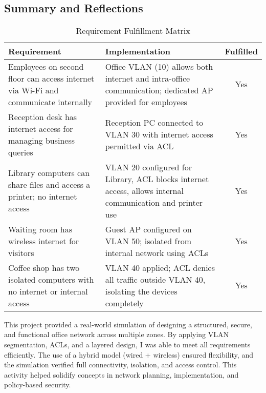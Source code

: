 \documentclass[11pt,a4paper]{article}
\let\oldincludegraphics\includegraphics
\renewcommand{\includegraphics}[2][]{%
  \begin{center}
    \oldincludegraphics[#1]{#2}
  \end{center}
}
\begin{document}
\begin{center}
\\[1em]
\\[1em]
\\[1em]
\\[1em]
\\[1em]
\\[1em]
\end{center}


\subsection{Summary and Reflections}

\begin{table}[h!]
\centering
\begin{tabular}{|p{6cm}|p{6cm}|c|}
\hline
\textbf{Requirement} & \textbf{Implementation} & \textbf{Fulfilled} \\
\hline
Employees on second floor can access internet via Wi-Fi and communicate internally & Office VLAN (10) allows both internet and intra-office communication; dedicated AP provided for employees & Yes \\
\hline
Reception desk has internet access for managing business queries & Reception PC connected to VLAN 30 with internet access permitted via ACL & Yes \\
\hline
Library computers can share files and access a printer; no internet access & VLAN 20 configured for Library, ACL blocks internet access, allows internal communication and printer use & Yes \\
\hline
Waiting room has wireless internet for visitors & Guest AP configured on VLAN 50; isolated from internal network using ACLs & Yes \\
\hline
Coffee shop has two isolated computers with no internet or internal access & VLAN 40 applied; ACL denies all traffic outside VLAN 40, isolating the devices completely & Yes \\
\hline
\end{tabular}
\caption{Requirement Fulfillment Matrix}
\end{table}

This project provided a real-world simulation of designing a structured, secure, and functional office network across multiple zones. By applying VLAN segmentation, ACLs, and a layered design, I was able to meet all requirements efficiently. The use of a hybrid model (wired + wireless) ensured flexibility, and the simulation verified full connectivity, isolation, and access control. This activity helped solidify concepts in network planning, implementation, and policy-based security.
\end{document}
